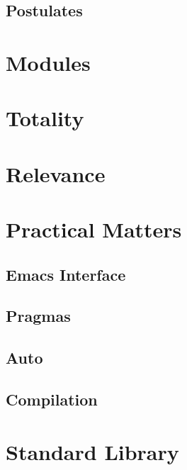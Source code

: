 \documentclass{article}
\begin{document}
\subsection{Postulates}
\section{Modules}
\label{sec:modules}
\section{Totality}
\section{Relevance}
\section{Practical Matters}
\subsection{Emacs Interface}
\subsection{Pragmas}
\subsection{Auto}
\subsection{Compilation}
\section{Standard Library}
\end{document}
